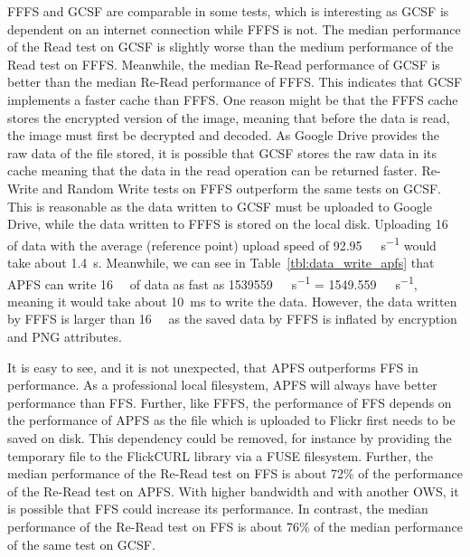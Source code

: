 FFFS and \gls{GCSF} are comparable in some tests, which is interesting as \gls{GCSF} is dependent on an internet connection while \gls{FFFS} is not. The median performance of the Read test on \gls{GCSF} is slightly worse than the medium performance of the Read test on \gls{FFFS}. Meanwhile, the median Re-Read performance of \gls{GCSF} is better than the median Re-Read performance of \gls{FFFS}. This indicates that \gls{GCSF} implements a faster cache than \gls{FFFS}. One reason might be that the \gls{FFFS} cache stores the encrypted version of the image, meaning that before the data is read, the image must first be decrypted and decoded. As Google Drive provides the raw data of the file stored, it is possible that \gls{GCSF} stores the raw data in its cache meaning that the data in the read operation can be returned faster. Re-Write and Random Write tests on \gls{FFFS} outperform the same tests on \gls{GCSF}. This is reasonable as the data written to \gls{GCSF} must be uploaded to Google Drive, while the data written to \gls{FFFS} is stored on the local disk. Uploading \SI{16}{\mega\byte} of data with the average (reference point) upload speed of \SI[per-mode = symbol]{92.95}{\mega\bit\per\second} would take about \SI{1.4}{\second}. Meanwhile, we can see in Table~\ref{tbl:data_write_apfs} that \gls{APFS} can write \SI{16}{\mega\byte} of data as fast as \SI[per-mode = symbol]{1539559}{\kilo\byte\per\second} = \SI[per-mode = symbol]{1549.559}{\mega\byte\per\second}, meaning it would take about \SI{10}{\milli\second} to write the data. However, the data written by \gls{FFFS} is larger than \SI{16}{\mega\byte} as the saved data by \gls{FFFS} is inflated by encryption and PNG attributes.

It is easy to see, and it is not unexpected, that \gls{APFS} outperforms \gls{FFS} in performance. As a professional local filesystem, \gls{APFS} will always have better performance than FFS. Further, like \gls{FFFS}, the performance of \gls{FFS} depends on the performance of \gls{APFS} as the file which is uploaded to Flickr first needs to be saved on disk. This dependency could be removed, for instance by providing the temporary file to the FlickCURL library via a \gls{FUSE} filesystem. Further, the median performance of the Re-Read test on \gls{FFS} is about 72\% of the performance of the Re-Read test on \gls{APFS}. With higher bandwidth and with another \gls{OWS}, it is possible that \gls{FFS} could increase its performance. In contrast, the median performance of the Re-Read test on \gls{FFS} is about 76\% of the median performance of the same test on \gls{GCSF}.